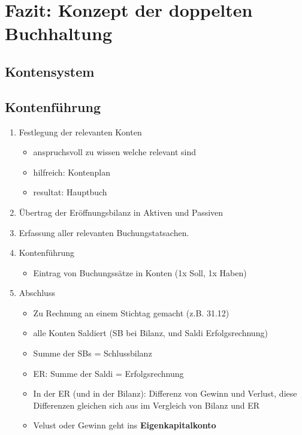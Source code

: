 
\section{Fazit: Konzept der doppelten Buchhaltung}

\subsection{Kontensystem}

\subsection{Kontenführung}

\begin{enumerate}
    \item Festlegung der relevanten Konten
    \begin{itemize}
        \item anspruchsvoll zu wissen welche relevant sind
        \item hilfreich: Kontenplan
        \item resultat: Hauptbuch
    \end{itemize}
    \item Übertrag der Eröffnungsbilanz in Aktiven und Passiven
    \item Erfassung aller relevanten Buchungstatsachen.
    \item Kontenführung
    \begin{itemize}
        \item Eintrag von Buchungssätze in Konten (1x Soll, 1x Haben)
    \end{itemize} 
    \item Abschluss 
    \begin{itemize}
        \item Zu Rechnung an einem Stichtag gemacht (z.B. 31.12)
        \item alle Konten Saldiert (SB bei Bilanz, und Saldi Erfolgsrechnung)
        \item Summe der SBs = Schlussbilanz
        \item ER: Summe der Saldi = Erfolgsrechnung
        \item In der ER (und in der Bilanz): Differenz von Gewinn und Verlust, diese Differenzen gleichen sich aus im Vergleich von Bilanz und ER
        \item Velust oder Gewinn geht ins \textbf{Eigenkapitalkonto}

\end{itemize}
\end{enumerate}
